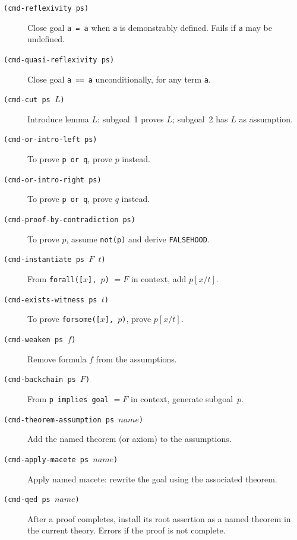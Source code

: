 \documentclass{amsbook}[openany]
\theoremstyle{definition}
\theoremstyle{remark}
\theoremstyle{remark}
\begin{document}
\begin{description}
\item[\texttt{(cmd-reflexivity ps)}]
  Close goal \texttt{a = a} when \texttt{a} is demonstrably defined.
  Fails if \texttt{a} may be undefined.

\item[\texttt{(cmd-quasi-reflexivity ps)}]
  Close goal \texttt{a == a} unconditionally, for any term \texttt{a}.

\item[\texttt{(cmd-cut ps $L$)}]
  Introduce lemma $L$: subgoal~1 proves $L$; subgoal~2 has $L$ as assumption.

\item[\texttt{(cmd-or-intro-left ps)}]
  To prove \texttt{p or q}, prove $p$ instead.

\item[\texttt{(cmd-or-intro-right ps)}]
  To prove \texttt{p or q}, prove $q$ instead.

\item[\texttt{(cmd-proof-by-contradiction ps)}]
  To prove $p$, assume \texttt{not(p)} and derive \texttt{FALSEHOOD}.

\item[\texttt{(cmd-instantiate ps $F$\ $t$)}]
  From \texttt{forall([$x$], $p$)} $= F$ in context, add $p[x/t]$.

\item[\texttt{(cmd-exists-witness ps $t$)}]
  To prove \texttt{forsome([$x$], $p$)}, prove $p[x/t]$.

\item[\texttt{(cmd-weaken ps $f$)}]
  Remove formula $f$ from the assumptions.

\item[\texttt{(cmd-backchain ps $F$)}]
  From \texttt{p implies goal} $= F$ in context, generate subgoal~$p$.

\item[\texttt{(cmd-theorem-assumption ps $\mathit{name}$)}]
  Add the named theorem (or axiom) to the assumptions.

\item[\texttt{(cmd-apply-macete ps $\mathit{name}$)}]
  Apply named macete: rewrite the goal using the associated theorem.

\item[\texttt{(cmd-qed ps $\mathit{name}$)}]
  After a proof completes, install its root assertion as a named theorem
  in the current theory.  Errors if the proof is not complete.

\end{description}
\end{document}
